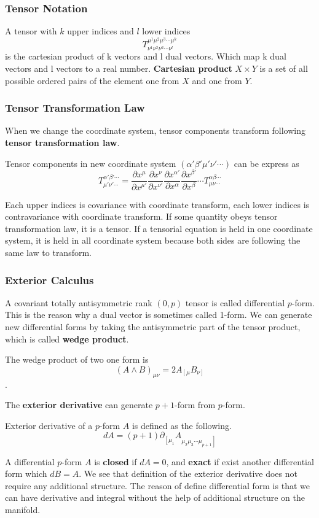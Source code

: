 \documentclass[12pt]{article}
\theoremstyle{mystyle}{\newtheorem{definition}{Definition}[section]}
\theoremstyle{mystyle}{\newtheorem{theorem}[definition]{Theorem}}
\theoremstyle{mystyle}{\newtheorem*{remark}{Remark}}
\theoremstyle{mystyle}{\newtheorem*{example}{Example}}
\theoremstyle{mystyle}{\newtheorem*{examples}{Examples}}
\theoremstyle{cstyle}{\newtheorem*{cthm}{}}
\begin{document}
\subsubsection{Tensor Notation}
A tensor with \(k\) upper indices and \(l\) lower indices
\[T^{\mu^1 \mu^2 \mu^3 \cdots \mu^k}_{\nu^1\nu^2\nu^2\cdots \nu^l}\]
is the cartesian product of k vectors and l dual vectors. Which map k dual vectors and l vectors to a real number.
\textbf{Cartesian product} $X \times Y$ is a set of all possible ordered pairs of the element one from $X$ and one from $Y$.

\subsubsection{Tensor Transformation Law}
When we change the coordinate system, tensor components transform following \textbf{tensor transformation law}.
\begin{definition}
  Tensor components in new coordinate system \((\alpha'\beta'\mu'\nu'\cdots)\) can be express as
  \[T^{\alpha'\beta'\cdots}_{\mu'\nu'\cdots} =
    \frac{\partial x^{\mu}}{\partial x^{\mu'}}\frac{\partial x^{\nu}}{\partial x^{\nu'}}\frac{\partial x^{\alpha'}}{\partial x^{\alpha}}
    \frac{\partial x^{\beta'}}{\partial x^{\beta}} \cdots
    T^{\alpha\beta\cdots}_{\mu\nu\cdots}\]
\end{definition}
Each upper indices is covariance with coordinate transform, each lower indices is contravariance with coordinate transform.
If some quantity obeys tensor transformation law, it is a tensor. If a tensorial equation is held in one coordinate system,
it is held in all coordinate
system because both sides are following the same law to transform.

\subsubsection{Exterior Calculus}
A covariant totally antisymmetric rank \((0,p)\) tensor is called differential \(p\)-form. This is the reason why a dual vector is sometimes called 1-form.
We can generate new differential forms by taking the antisymmetric part of the tensor product, which is called \textbf{wedge product}.
\begin{example}
  The wedge product of two one form is \[(A\wedge B)_{\mu\nu}= 2A_{\left[\mu\right.}B_{\left.\nu\right]}\].
\end{example}
The \textbf{exterior derivative} can generate \(p+1\)-form from \(p\)-form.
\begin{definition}
  Exterior derivative of a \(p\)-form \(A\) is defined as the following.
  \[dA = (p+1)\partial_{\left[\mu_1\right.}A_{\left.\mu_2\mu_3\cdots\mu_{p+1}\right]}\]
\end{definition}
A differential \(p\)-form \(A\) is \textbf{closed} if \(dA =0\), and \textbf{exact} if exist another differential form which \(dB = A\).
We see that definition of the exterior derivative does not require any additional structure.
The reason of define differential form is that we can have derivative and integral without the help of additional structure on the manifold.
\end{document}
